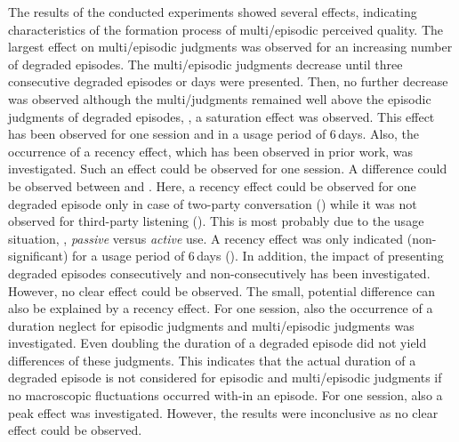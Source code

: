 The results of the conducted experiments showed several effects, indicating characteristics of the formation process of multi\-/episodic perceived quality.
The largest effect on multi\-/episodic judgments was observed for an increasing number of degraded episodes.
The multi\-/episodic judgments decrease until three consecutive degraded episodes or days were presented.
Then, no further decrease was observed although the multi\-/judgments remained well above the episodic judgments of degraded episodes, \ie, a saturation effect was observed.
This effect has been observed for one session and in a usage period of 6\,days.
Also, the occurrence of a recency effect, which has been observed in prior work, was investigated.
Such an effect could be observed for one session.
A difference could be observed between  and \EIIa{}.
Here, a recency effect could be observed for one degraded episode only in case of two-party conversation () while it was not observed for third-party listening (\EIIa{}).
This is most probably due to the usage situation, \ie, \emph{passive} versus \emph{active} use.
A recency effect was only indicated (non-significant) for a usage period of 6\,days  ().
In addition, the impact of presenting degraded episodes consecutively and non-consecutively has been investigated.
However, no clear effect could be observed.
The small, potential difference can also be explained by a recency effect.
For one session, also the occurrence of a duration neglect for episodic judgments and multi\-/episodic judgments was investigated.
Even doubling the duration of a degraded episode did not yield differences of these judgments.
This indicates that the actual duration of a degraded episode is not considered for episodic and multi\-/episodic judgments if no macroscopic fluctuations occurred with-in an episode.
For one session, also a peak effect was investigated.
However, the results were inconclusive as no clear effect could be observed.

